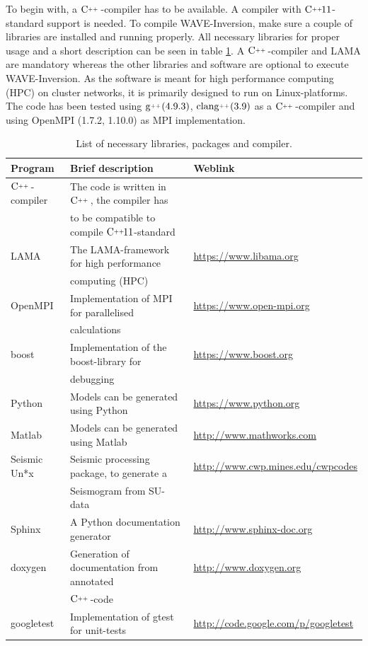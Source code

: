 \documentclass[pdftex,a4paper,parskip,listof=totoc,bibliography=totoc,onehalfspacing,12pt]{scrreprt}
\newcommand{\CC}[1][]{$\text{C\hspace{0ex}}^{_{_{_{++}}}}					%
                      \ifthenelse{\equal{#1}{}}{}{\text{\hspace{-.625ex}#1}}$}
\newcommand{\clang}[1][]{$\text{clang\hspace{0ex}}^{_{_{_{++}}}}		%
                      \ifthenelse{\equal{#1}{}}{}{\text{\hspace{-.25ex}(#1)}}$}
\newcommand{\gCC}[1][]{$\text{g\hspace{0ex}}^{_{_{_{++}}}}				%
                      \ifthenelse{\equal{#1}{}}{}{\text{\hspace{-.25ex}(#1)}}$}
\begin{document}
To begin with, a \CC-compiler has to be available. A compiler with  \CC[11]-standard support is needed. To compile WAVE-Inversion, make sure a couple of libraries are installed and running properly. All necessary libraries for proper usage and a short description can be seen in table \ref{tab:pack}. A \CC-compiler and LAMA are mandatory whereas the other libraries and software are optional to execute WAVE-Inversion.
As the software is meant for high performance computing (HPC) on cluster networks, it is primarily designed to run on Linux-platforms. The code has been tested using \gCC[4.9.3], \clang[3.9] as a  \CC-compiler and using OpenMPI (1.7.2, 1.10.0) as MPI implementation.
\begin{table}[h!]
\caption{List of necessary libraries, packages and compiler.}\label{tab:pack}
\centering
\begin{adjustbox}{width=1\textwidth,center=\textwidth}
	\begin{tabular}{lll}
	\toprule
	Program & Brief description & Weblink \\
	\midrule
	\CC-compiler	& The code is written in \CC[], the compiler	has 		& \\
										& to be compatible to compile \CC[11]-standard					& \\
LAMA 				& The LAMA-framework for high performance			& \url{https://www.libama.org} \\
	& computing 	(HPC)							    & \\
	\midrule
	OpenMPI			& Implementation of MPI for parallelised  			& \url{https://www.open-mpi.org} \\
										& calculations						& \\
		boost					& Implementation of the boost-library	for  				& \url{https://www.boost.org}		\\
										& debugging																& \\										
	Python				& Models can be generated using Python 		& \url{https://www.python.org}\\
	Matlab				& Models can be generated using Matlab		& \url{http://www.mathworks.com}\\	
	
	
	Seismic Un*x	& 	Seismic processing package, to generate a  	& \url{http://www.cwp.mines.edu/cwpcodes}\\ 
											&  Seismogram from SU-data  															& \\
	
	
	Sphinx				& 	A Python documentation generator 							& \url{http://www.sphinx-doc.org}\\
	doxygen			& 	Generation of documentation from annotated				& \url{http://www.doxygen.org}\\
										& \CC-code 															& \\
	googletest & Implementation of gtest for unit-tests & \url{http://code.google.com/p/googletest}\\
	\bottomrule
	\end{tabular}
	\end{adjustbox}
\end{table}
\end{document}
